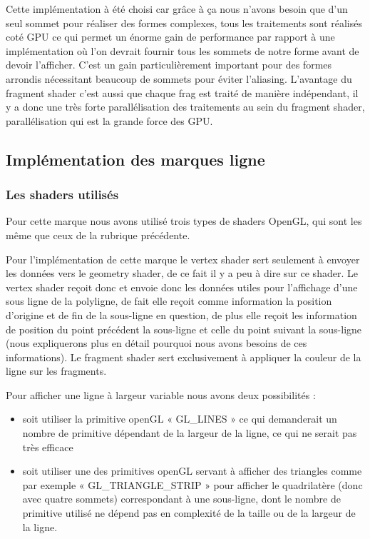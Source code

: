 \documentclass[12pt]{article}
\begin{document}
Cette implémentation à été choisi car grâce à ça nous n'avons besoin que d'un seul sommet pour réaliser des formes complexes, tous les traitements sont réalisés coté GPU ce qui permet un énorme gain de performance par rapport à une implémentation où l'on devrait fournir tous les sommets de notre forme avant de devoir l'afficher. C'est un gain particulièrement important pour des formes arrondis nécessitant beaucoup de sommets pour éviter l'aliasing.
L'avantage du fragment shader c'est aussi que chaque \gls{frag} est traité de manière indépendant, il y a donc une très forte parallélisation des traitements au sein du fragment shader, parallélisation qui est la grande force des GPU.

\subsection{Implémentation des marques ligne}
\subsubsection{Les shaders utilisés}
Pour cette marque nous avons utilisé trois types de shaders OpenGL, qui sont les même que ceux de la rubrique précédente.

Pour l’implémentation de cette marque le vertex shader sert seulement à envoyer
 les données vers le geometry shader, de ce fait il y a peu à dire sur ce shader.
 Le vertex shader reçoit donc et envoie donc les données utiles pour l’affichage
 d’une sous ligne de la polyligne, de fait elle reçoit comme information la position
 d’origine et de fin de la sous-ligne en question, de plus elle reçoit les information
 de position du point précédent la sous-ligne et celle du point suivant la sous-ligne
 (nous expliquerons plus en détail pourquoi nous avons besoins de ces informations).
 Le fragment shader sert exclusivement à appliquer la couleur de la ligne sur les fragments.

Pour afficher une ligne à largeur variable nous avons deux possibilités :
\begin{itemize}
\item soit utiliser la primitive openGL « GL\_LINES » ce qui demanderait un nombre de primitive dépendant de la largeur de la ligne, ce qui ne serait pas très efficace
\item soit utiliser une des primitives openGL servant à afficher des triangles comme par exemple « GL\_TRIANGLE\_STRIP » pour afficher le quadrilatère (donc avec quatre sommets) correspondant à une sous-ligne, dont le nombre de primitive utilisé ne dépend pas en complexité de la taille ou de la largeur de la ligne.
\end{itemize}
\end{document}
